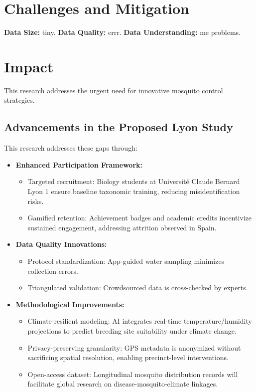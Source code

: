 \documentclass[acmlarge]{acmart}
\begin{document}
\section{Challenges and Mitigation}
\textbf{Data Size:} tiny.  
\textbf{Data Quality:} errr.  
\textbf{Data Understanding:} me problems.


\section{Impact}
This research addresses the urgent need for innovative mosquito control strategies.


\subsection{Advancements in the Proposed Lyon Study}
This research addresses these gaps through:
\begin{itemize}
\item \textbf{Enhanced Participation Framework:}
\begin{itemize}
\item Targeted recruitment: Biology students at Université Claude Bernard Lyon 1 ensure baseline taxonomic training, reducing misidentification risks.
\item Gamified retention: Achievement badges and academic credits incentivize sustained engagement, addressing attrition observed in Spain.
\end{itemize}
\item \textbf{Data Quality Innovations:}
\begin{itemize}
\item Protocol standardization: App-guided water sampling minimizes collection errors.
\item Triangulated validation: Crowdsourced data is cross-checked by experts.
\end{itemize}
\item \textbf{Methodological Improvements:}
\begin{itemize}
\item Climate-resilient modeling: AI integrates real-time temperature/humidity projections to predict breeding site suitability under climate change.
\item Privacy-preserving granularity: GPS metadata is anonymized without sacrificing spatial resolution, enabling precinct-level interventions.
\item Open-access dataset: Longitudinal mosquito distribution records will facilitate global research on disease-mosquito-climate linkages.
\end{itemize}
\end{itemize}














\end{document}
